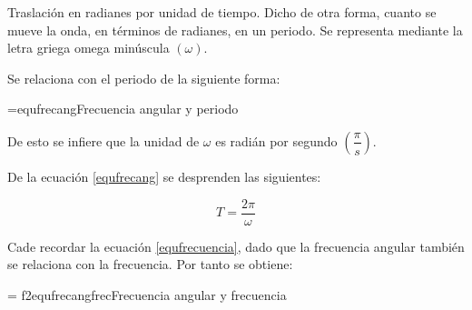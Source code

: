 Traslación en radianes por unidad de tiempo. Dicho de otra forma, cuanto se mueve la onda, en términos de radianes, en un periodo. Se representa mediante la letra griega omega minúscula $(\omega)$.

Se relaciona con el periodo de la siguiente forma:

\begin{listequbox}
  {\omega=}{equfrecang}{Frecuencia angular y periodo}
\end{listequbox}

De esto se infiere que la unidad de $\omega$ es radián por segundo $\left(\dfrac{\pi}{s}\right)$.

De la ecuación \ref{equfrecang} se desprenden las siguientes:

\[\boxed{
  T = \dfrac{2\pi}{\omega}
}\]

Cade recordar la ecuación \ref{equfrecuencia}, dado que la frecuencia angular también se relaciona con la frecuencia. Por tanto se obtiene:

\begin{listequbox}
  {\omega = f2\pi}{equfrecangfrec}{Frecuencia angular y frecuencia}
\end{listequbox}
